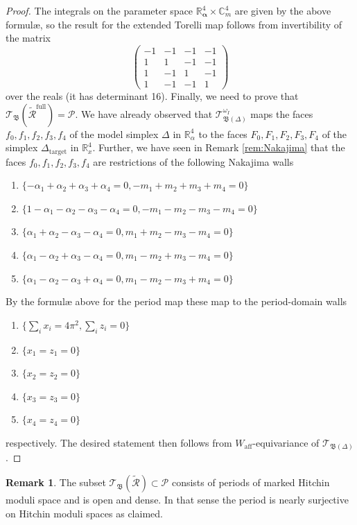 \documentclass[12pt,letterpaper,reqno]{amsart}
\def\bm#1{#1}%
\def\mathbf#1{#1}%
\theoremstyle{remark}
\theoremstyle{definition}
\newtheorem{rem}[thm]{Remark}
\numberwithin{thm}{section}
\numberwithin{equation}{section}
\numberwithin{figure}{section}
\newcommand{\cP}{\ensuremath{\mathcal P}}
\newcommand{\R}{\ensuremath{\mathbb R}}
\newcommand{\C}{\ensuremath{\mathbb C}}
\newcommand{\bfalpha}{\ensuremath{\bm \alpha}}
\newcommand{\aff}{\mathrm{aff}}
\newcommand{\Simplex}{\Delta}
\begin{document}
\begin{proof}
The integrals on the parameter space $\R^4_{\boldsymbol{\alpha}} \times \C^4_{\mathbf{m}}$ are given by the above formul{\ae}, so the result for the extended Torelli map follows from invertibility of the matrix
\[
\begin{pmatrix}
-1 & -1 & -1 & -1 \\
1 & 1 & -1 & -1 \\
1 & -1 & 1 & -1 \\
1 & -1 & -1 & 1	
\end{pmatrix}
\]
over the reals (it has determinant 16). 
Finally, we need to prove that $\mathcal{T}_\mathfrak{B}(\widetilde{\mathcal{R}}^{\mathrm{full}})=\cP$. We have already observed that $\mathcal{T}_{\mathfrak{B}(\Simplex)}^{\omega_I}$ maps the faces $f_0, f_1, f_2, f_3, f_4$ of the model simplex $\Simplex$ in $\R^4_{\bfalpha}$ to the faces $F_0, F_1, F_2, F_3, F_4$ of the simplex $\Simplex_{\mathrm{target}}$ in $\R^4_{\mathbf{x}}$. Further, we have seen in Remark \ref{rem:Nakajima} that the faces $f_0, f_1, f_2, f_3, f_4$ are restrictions of the following Nakajima walls
\begin{enumerate}
\item $\{ -\alpha_1+\alpha_2+\alpha_3+\alpha_4 = 0, -m_1+m_2+m_3+m_4=0\} $	
\item $\{1- \alpha_1-\alpha_2-\alpha_3 - \alpha_4 = 0, -m_1-m_2-m_3-m_4=0\}$
\item $\{\alpha_1+\alpha_2-\alpha_3-\alpha_4=0, m_1+m_2-m_3-m_4 =0\}$
\item $\{\alpha_1-\alpha_2+\alpha_3-\alpha_4=0, m_1-m_2+m_3-m_4 =0\}$
\item $\{\alpha_1-\alpha_2-\alpha_3+\alpha_4=0, m_1-m_2-m_3+m_4 =0\}$
\end{enumerate}
By the formul{\ae} above for the period map these map to the period-domain walls 
\begin{enumerate}
	\item $\{\sum_i x_i = 4 \pi^2, \sum_i z_i=0\}$ 
	\item $\{x_1=z_1=0\}$
	\item $\{x_2=z_2=0\}$
	\item $\{x_3=z_3=0\}$
	\item $\{x_4=z_4=0\}$
\end{enumerate}
respectively. The desired statement then follows from $W_\aff$-equivariance of $\mathcal{T}_{\mathfrak{B}(\Simplex)}$.
\end{proof}

\begin{rem}\label{rem:Torellisurjectivity}
The subset $\mathcal{T}_\mathfrak{B}(\widetilde{\mathcal{R}}) \subset \cP$ consists of periods of marked Hitchin moduli space and is open and dense. In that sense the period is nearly surjective on Hitchin moduli spaces as claimed.
\end{rem}
\end{document}

